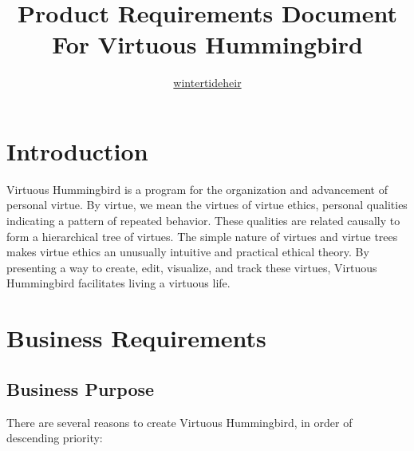 \documentclass{article}
\title{Product Requirements Document \\ \vspace{1mm} \normalsize For Virtuous Hummingbird}
\author{\href{https://github.com/wintertideheir}{wintertideheir}}
\date{}
\begin{document}
\maketitle
\tableofcontents

\section{Introduction}

Virtuous Hummingbird is a program for the organization and advancement of personal virtue.
By virtue, we mean the virtues of virtue ethics, personal qualities indicating a pattern of repeated behavior.
These qualities are related causally to form a hierarchical tree of virtues. 
The simple nature of virtues and virtue trees makes virtue ethics an unusually intuitive and practical ethical theory.
By presenting a way to create, edit, visualize, and track these virtues, Virtuous Hummingbird facilitates living a virtuous life.

\section{Business Requirements}

\subsection{Business Purpose}

There are several reasons to create Virtuous Hummingbird, in order of descending priority:
\end{document}
